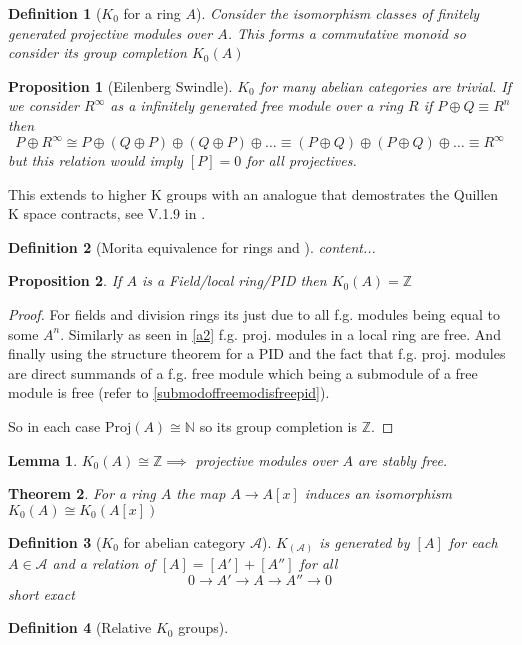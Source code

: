 \documentclass[12pt]{article}
\numberwithin{equation}{section}
\newcommand{\Z}{\mathbb{Z}}
\newcommand{\N}{\mathbb{N}}
\newtheorem{theorem}{Theorem}[section]
\newtheorem{definition}{Definition}[section]
\newtheorem{lemma}[theorem]{Lemma}
\newtheorem{proposition}{Proposition}[section]
\begin{document}
	\begin{definition}[$K_0$ for a ring $A$]
		Consider the isomorphism classes of finitely generated projective modules over $A$. This forms a commutative monoid so consider its group completion $K_0(A)$
	\end{definition}
	
	\begin{proposition}[Eilenberg Swindle]
		$K_0$ for many abelian categories are trivial. If we consider $R^\infty$ as a infinitely generated free module over a ring $R$ if $P \oplus Q \equiv R^n$ then \[ P \oplus R^\infty \cong P \oplus (Q \oplus P) \oplus (Q \oplus P) \oplus \dots \equiv (P \oplus Q) \oplus (P \oplus Q) \oplus \dots \equiv R^\infty \] but this relation would imply $[P]=0 $ for all projectives. 
	\end{proposition}
	This extends to higher K groups with an analogue that demostrates the Quillen K space contracts, see V.1.9 in \cite{weibel2013k}.
	
	\begin{definition}[Morita equivalence for rings and ]
		content...
	\end{definition}
	
	\begin{proposition}\label{k0pidisZ}
	If $A$ is a Field/local ring/PID then $K_0(A)=\Z$
	\end{proposition}
	\begin{proof}
		For fields and division rings its just due to all f.g. modules being equal to some $A^n$. Similarly as seen in \ref{a2} f.g. proj. modules in a local ring are free. And finally using the structure theorem for a PID and the fact that f.g. proj. modules are direct summands of a f.g. free module which being a submodule of a free module is free (refer to \ref{submodoffreemodisfreepid}).
		
		So in each case $\mathrm{Proj}(A) \cong \N$ so its group completion is $\Z.$
		\end{proof}
		
	\begin{lemma}
		$K_0(A) \cong \Z \implies $ projective modules over $A$ are stably free.
	\end{lemma}
	\begin{theorem}\label{extensionk0iscong}
		For a ring $A$ the map $A \to A[x]$ induces an isomorphism $K_0(A) \cong K_0(A[x])$ 
	\end{theorem}
	
	\begin{definition}[$K_0$ for abelian category $\mathcal{A}$]
		$K_(\mathcal A)$ is generated by $[A]$ for each $A \in \mathcal{A}$ and a relation of $[A]=[A']+[A'']$ for all \[ 0 \to A' \to A \to A'' \to 0 \]
		short exact
	\end{definition}
	\begin{definition}[Relative $K_0$ groups]
	\end{definition}
\end{document}
